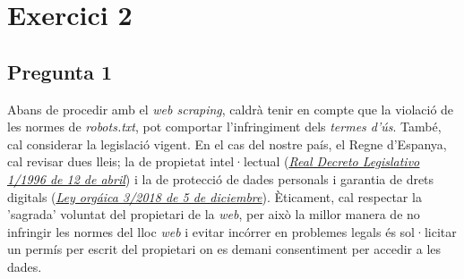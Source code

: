 \documentclass[a4paper,12pt]{report}
\begin{document}
\section*{Exercici 2}
\subsection*{Pregunta 1}
Abans de procedir amb el \textit{web scraping}, caldrà tenir en compte que la violació de les normes de \textit{robots.txt}, pot comportar l'infringiment dels \textit{termes d'ús}. També, cal considerar la legislació vigent. En el cas del nostre país, el Regne d'Espanya, cal revisar dues lleis; la de propietat intel·lectual (\href{https://www.boe.es/buscar/pdf/1996/BOE-A-1996-8930-consolidado.pdf}{\underline{\textit{Real Decreto Legislativo 1/1996 de 12 de abril}}}) i la de protecció de dades personals i garantia de drets digitals (\href{https://www.boe.es/buscar/pdf/2018/BOE-A-2018-16673-consolidado.pdf}{\underline{\textit{Ley orgáica 3/2018 de 5 de diciembre}}}). Èticament, cal respectar la 'sagrada' voluntat del propietari de la \textit{web}, per això la millor manera de no infringir les normes del lloc \textit{web} i evitar incórrer en problemes legals és sol·licitar un permís per escrit del propietari on es demani consentiment per accedir a les dades. 
\end{document}
